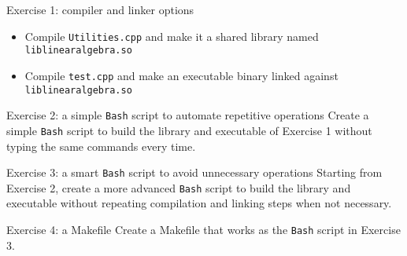 \documentclass[10pt]{beamer}
\begin{document}
\begin{frame}{Exercise 1: compiler and linker options}
  \begin{itemize}
  \item Compile \texttt{Utilities.cpp} and make it a shared library named \texttt{liblinearalgebra.so}\\[5mm]
  \item Compile \texttt{test.cpp} and make an executable binary linked against \texttt{liblinearalgebra.so}
  \end{itemize}
\end{frame}

\begin{frame}{Exercise 2: a simple \texttt{Bash} script to automate repetitive operations}
  Create a simple \texttt{Bash} script to build the library and executable of Exercise 1 without typing the same commands every time.
\end{frame}

\begin{frame}{Exercise 3: a smart \texttt{Bash} script to avoid unnecessary operations}
  Starting from Exercise 2, create a more advanced \texttt{Bash} script to build the library and executable without repeating compilation and linking steps when not necessary.
\end{frame}

\begin{frame}{Exercise 4: a Makefile}
  Create a Makefile that works as the \texttt{Bash} script in Exercise 3.
\end{frame}
\end{document}
